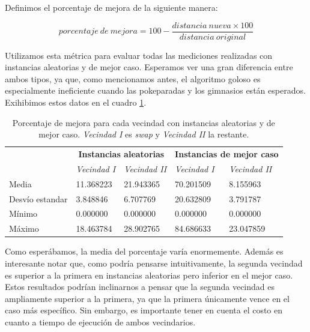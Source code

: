 Definimos el porcentaje de mejora de la siguiente manera:

\begin{equation*}
    porcentaje\ de\ mejora = 100 - \frac{distancia\ nueva \times 100}{distancia\ original}
\end{equation*}

Utilizamos esta m\'etrica para evaluar todas las mediciones realizadas con instancias aleatorias y de mejor caso. Esperamos ver una gran diferencia entre ambos tipos, ya que, como mencionamos antes, el algoritmo goloso es especialmente ineficiente cuando las pokeparadas y los gimnasios est\'an esperados. Exihibimos estos datos en el cuadro \ref{table:porcentaje_mejora}.

\begin{table}[H]
    \begin{center}
        \begin{tabular}{ | l | l | l | l | l | }
            \hline
            \multicolumn{1}{|c|}{}&
            \multicolumn{2}{|c|}{\textbf{Instancias aleatorias}}&
            \multicolumn{2}{|c|}{\textbf{Instancias de mejor caso}}\\
            \cline{2-5}
                            &    \textit{Vecindad I}     &    \textit{Vecindad II}    &    \textit{Vecindad I}     &    \textit{Vecindad II}    \\ \hline
            Media           &    11.368223  &   21.943365   &   70.201509   &    8.155963   \\ \hline
            Desv\'io estandar       &   3.848846    &    6.707769   &   20.632809   &   3.791787    \\ \hline
            M\'inimo        &   0.000000    &    0.000000   &   0.000000    &   0.000000    \\ \hline
            M\'aximo        &   18.463784   &    28.902765  &       84.686633   &    23.047859  \\ \hline
        \end{tabular}
    \end{center}
    \caption{Porcentaje de mejora para cada vecindad con instancias aleatorias y de mejor caso. \textit{Vecindad I} es \textit{swap} y \textit{Vecindad II} la restante.}    
    \label{table:porcentaje_mejora}
\end{table} 

Como esper\'abamos, la media del porcentaje var\'ia enormemente. Adem\'as es interesante notar que, como podr\'ia pensarse intuitivamente, la segunda vecindad es superior a la primera en instancias aleatorias pero inferior en el mejor caso. Estos resultados podr\'ian inclinarnos a pensar que la segunda vecindad es ampliamente superior a la primera, ya que la primera \'unicamente vence en el caso m\'as espec\'ifico. Sin embargo, es importante tener en cuenta el costo en cuanto a tiempo de ejecuci\'on de ambos vecindarios.

